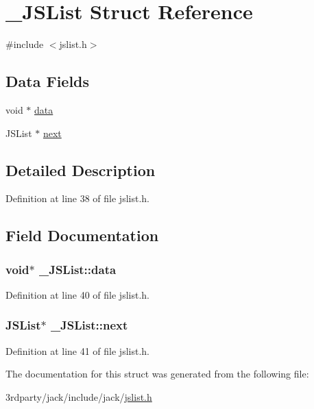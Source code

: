 \hypertarget{struct__JSList}{\section{\-\_\-\-J\-S\-List \-Struct \-Reference}
\label{df/df0/struct__JSList}
}


{\ttfamily \#include $<$jslist.\-h$>$}

\subsection*{\-Data \-Fields}
\begin{DoxyCompactItemize}
\item 
void $\ast$ \hyperlink{struct__JSList_ab754cead767f8786acf7fe3d6b9fa941}{data}
\item 
\-J\-S\-List $\ast$ \hyperlink{struct__JSList_af49d8b6060257c85bcf82315be8e6028}{next}
\end{DoxyCompactItemize}


\subsection{\-Detailed \-Description}


\-Definition at line 38 of file jslist.\-h.



\subsection{\-Field \-Documentation}
\hypertarget{struct__JSList_ab754cead767f8786acf7fe3d6b9fa941}{
\subsubsection[{data}]{\setlength{\rightskip}{0pt plus 5cm}void$\ast$ {\bf \-\_\-\-J\-S\-List\-::data}}}\label{df/df0/struct__JSList_ab754cead767f8786acf7fe3d6b9fa941}


\-Definition at line 40 of file jslist.\-h.

\hypertarget{struct__JSList_af49d8b6060257c85bcf82315be8e6028}{
\subsubsection[{next}]{\setlength{\rightskip}{0pt plus 5cm}\-J\-S\-List$\ast$ {\bf \-\_\-\-J\-S\-List\-::next}}}\label{df/df0/struct__JSList_af49d8b6060257c85bcf82315be8e6028}


\-Definition at line 41 of file jslist.\-h.



\-The documentation for this struct was generated from the following file\-:\begin{DoxyCompactItemize}
\item 
3rdparty/jack/include/jack/\hyperlink{jslist_8h}{jslist.\-h}\end{DoxyCompactItemize}
